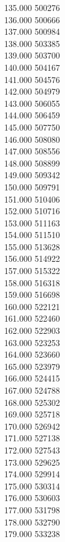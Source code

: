 { 135.000	500276 \\
 136.000	500666 \\
 137.000	500984 \\
 138.000	503385 \\
 139.000	503700 \\
 140.000	504167 \\
 141.000	504576 \\
 142.000	504979 \\
 143.000	506055 \\
 144.000	506459 \\
 145.000	507750 \\
 146.000	508080 \\
 147.000	508556 \\
 148.000	508899 \\
 149.000	509342 \\
 150.000	509791 \\
 151.000	510406 \\
 152.000	510716 \\
 153.000	511163 \\
 154.000	511510 \\
 155.000	513628 \\
 156.000	514922 \\
 157.000	515322 \\
 158.000	516318 \\
 159.000	516698 \\
 160.000	522121 \\
 161.000	522460 \\
 162.000	522903 \\
 163.000	523253 \\
 164.000	523660 \\
 165.000	523979 \\
 166.000	524415 \\
 167.000	524788 \\
 168.000	525302 \\
 169.000	525718 \\
 170.000	526942 \\
 171.000	527138 \\
 172.000	527543 \\
 173.000	529625 \\
 174.000	529914 \\
 175.000	530314 \\
 176.000	530603 \\
 177.000	531798 \\
 178.000	532790 \\
 179.000	533238 \\
}
